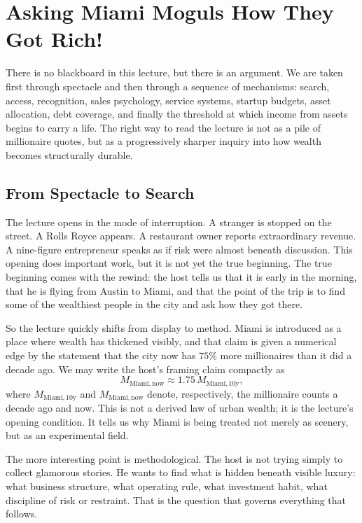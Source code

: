 \chapter{Asking Miami Moguls How They Got Rich!}

There is no blackboard in this lecture, but there is an argument. We are taken first through spectacle and then through a sequence of mechanisms: search, access, recognition, sales psychology, service systems, startup budgets, asset allocation, debt coverage, and finally the threshold at which income from assets begins to carry a life. The right way to read the lecture is not as a pile of millionaire quotes, but as a progressively sharper inquiry into how wealth becomes structurally durable.

\section{From Spectacle to Search}

The lecture opens in the mode of interruption. A stranger is stopped on the street. A Rolls Royce appears. A restaurant owner reports extraordinary revenue. A nine-figure entrepreneur speaks as if risk were almost beneath discussion. This opening does important work, but it is not yet the true beginning. The true beginning comes with the rewind: the host tells us that it is early in the morning, that he is flying from Austin to Miami, and that the point of the trip is to find some of the wealthiest people in the city and ask how they got there.

So the lecture quickly shifts from display to method. Miami is introduced as a place where wealth has thickened visibly, and that claim is given a numerical edge by the statement that the city now has \(75\%\) more millionaires than it did a decade ago. We may write the host's framing claim compactly as
\begin{equation}
M_{\mathrm{Miami,now}} \approx 1.75\,M_{\mathrm{Miami,10y}},
\end{equation}
where \(M_{\mathrm{Miami,10y}}\) and \(M_{\mathrm{Miami,now}}\) denote, respectively, the millionaire counts a decade ago and now. This is not a derived law of urban wealth; it is the lecture's opening condition. It tells us why Miami is being treated not merely as scenery, but as an experimental field.

The more interesting point is methodological. The host is not trying simply to collect glamorous stories. He wants to find what is hidden beneath visible luxury: what business structure, what operating rule, what investment habit, what discipline of risk or restraint. That is the question that governs everything that follows.


